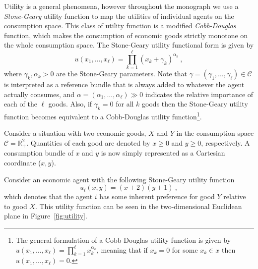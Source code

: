 Utility is a general phenomena, however throughout the monograph we use a \emph{Stone-Geary} utility function to map the utilities of individual agents on the consumption space. This class of utility function is a modified \emph{Cobb-Douglas} function, which makes the consumption of economic goods strictly monotone on the whole consumption space. The Stone-Geary utility functional form is given by
\begin{equation}
u\left( x_{1}, \ldots, x_{\ell} \right) = \prod^{\ell}_{k = 1} \left( x_{k} + \gamma_{k} \right)^{\alpha_{k}} ~ ,
\end{equation}
where $\gamma_{k}, \alpha_{k} > 0$ are the Stone-Geary parameters. Note that $\gamma = \left( \gamma_{1}, \ldots, \gamma_{\ell} \right) \in \mathcal{C}$ is interpreted as a reference bundle that is always added to whatever the agent actually consumes, and $\alpha = \left( \alpha_{1}, \ldots, \alpha_{\ell} \right) \gg 0$ indicates the relative importance of each of the $\ell$ goods. Also, if $\gamma_{k} = 0$ for all $k$ goods then the Stone-Geary utility function becomes equivalent to a Cobb-Douglas utility function\footnote{The general formulation of a Cobb-Douglas utility function is given by $u\left( x_{1}, \ldots, x_{\ell} \right) = \prod^{\ell}_{k = 1} x_{k}^{\alpha_{k}}$, meaning that if $x_{k} = 0$ for some $x_{k} \in x$ then $u\left( x_{1}, \ldots, x_{\ell} \right) = 0$.}.
\begin{example} \label{ex:utility}
Consider a situation with two economic goods, $X$ and $Y$ in the consumption space $\mathcal{C} = \mathbb{R}_{+}^{2}$. Quantities of each good are denoted by $x \geqslant 0$ and $y \geqslant 0$, respectively. A consumption bundle of $x$ and $y$ is now simply represented as a Cartesian coordinate ($x, y$).

Consider an economic agent with the following Stone-Geary utility function
\begin{equation}
u_{i}(x,y) = (x + 2) (y + 1) ~ ,
\end{equation}
which denotes that the agent $i$ has some inherent preference for good $Y$ relative to good $X$. This utility function can be seen in the two-dimensional Euclidean plane in Figure~\ref{fig:utility}.
\end{example}
